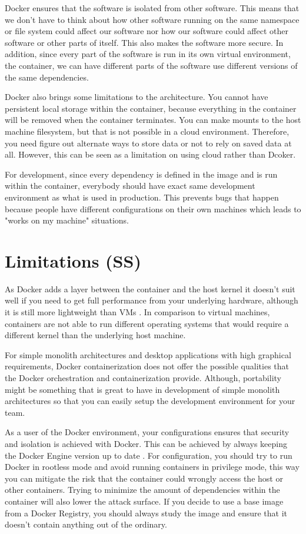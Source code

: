 \documentclass[fleqn,12pt]{olplainarticle}
\begin{document}
Docker ensures that the software is isolated from other software. This means that we don't have to think about how other software running on the same namespace or file system could affect our software nor how our software could affect other software or other parts of itself. This also makes the software more secure.
In addition, since every part of the software is run in its own virtual environment, the container, we can have different parts of the software use different versions of the same dependencies.

Docker also brings some limitations to the architecture. You cannot have persistent local storage within the container, because everything
in the container will be removed when the container terminates. You can make mounts to the host machine filesystem, but that is not possible in a cloud
environment. Therefore, you need figure out alternate ways to store data or not to rely on saved data at all. However, this can be seen as a limitation
on using cloud rather than Dcoker.

For development, since every dependency is defined in the image and is run within the container, everybody should have exact same development environment as what is used in production. This prevents bugs that happen because people have different configurations on their own machines which leads to "works on my machine" situations.

\section{Limitations (SS)}

As Docker adds a layer between the container and the host kernel it doesn't suit well if you need to get full performance from your underlying hardware, although it is still more lightweight than VMs \citep{cloudsavvy:not_to_use}. In comparison to virtual machines, containers are not able to run different operating systems that would require a different kernel than the underlying host machine. 

For simple monolith architectures and desktop applications with high graphical requirements, Docker containerization does not offer the possible qualities that the Docker orchestration and containerization provide. Although, portability might be something that is great to have in development of simple monolith architectures so that you can easily setup the development environment for your team.

As a user of the Docker environment, your configurations ensures that security and isolation is achieved with Docker. This can be achieved by always keeping the Docker Engine version up to date \citep{aquasec:docker-security-best-practices}. For configuration, you should try to run Docker in rootless mode and avoid running containers in privilege mode, this way you can mitigate the risk that the container could wrongly access the host or other containers. Trying to minimize the amount of dependencies within the container will also lower the attack surface. If you decide to use a base image from a Docker Registry, you should always study the image and ensure that it doesn't contain anything out of the ordinary.
\end{document}
